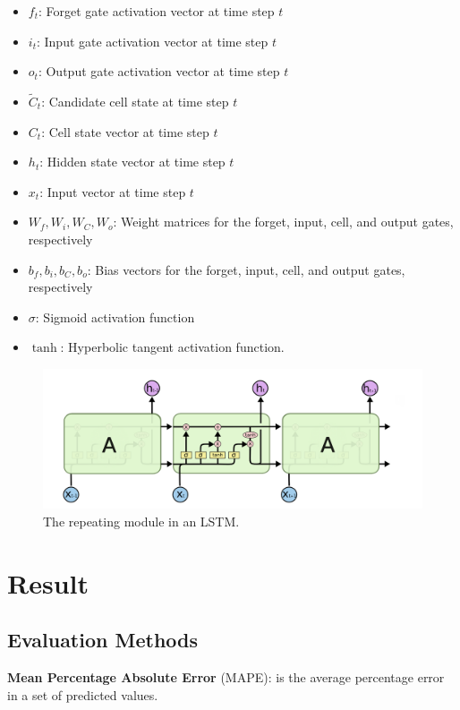 \documentclass{ieeeojies}
\begin{document}
\begin{itemize}
  \item \( f_t \): Forget gate activation vector at time step \( t \)
  \item \( i_t \): Input gate activation vector at time step \( t \)
  \item \( o_t \): Output gate activation vector at time step \( t \)
  \item \( \tilde{C}_t \): Candidate cell state at time step \( t \)
  \item \( C_t \): Cell state vector at time step \( t \)
  \item \( h_t \): Hidden state vector at time step \( t \)
  \item \( x_t \): Input vector at time step \( t \)
  \item \( W_f, W_i, W_C, W_o \): Weight matrices for the forget, input, cell, and output gates, respectively
  \item \( b_f, b_i, b_C, b_o \): Bias vectors for the forget, input, cell, and output gates, respectively
  \item \( \sigma \): Sigmoid activation function
  \item \( \tanh \): Hyperbolic tangent activation function. \cite{b34, b35}
\end{itemize}
\begin{figure}[H]
  \centering
  \begin{minipage}{1.0\linewidth}
    \centering
    \includegraphics[width=\linewidth]{Image/LSTM/Model_LSTM.png}
    \caption{The repeating module in an LSTM.}
    \label{fig:8}
  \end{minipage}
\end{figure}
\section{Result}
\subsection{Evaluation Methods}
\textbf{Mean Percentage Absolute Error} (MAPE): is the average percentage error in a set of predicted values.
\end{document}
